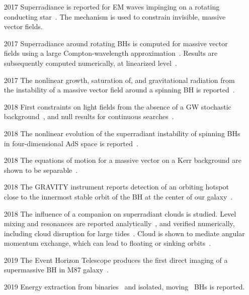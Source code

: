 \documentclass[11pt]{article}
\numberwithin{equation}{section} %
\begin{document}
\begin{itemize}[noitemsep]
\item[2017] Superradiance is reported for EM waves impinging on a rotating conducting star~\cite{Cardoso:2017kgn}. The 
mechanism is used to constrain invisible, massive vector fields.

\item[2017] Superradiance around rotating BHs is computed for massive vector fields using a large Compton-wavelength approximation~\cite{Baryakhtar:2017ngi}. Results are subsequently computed numerically, at linearized level~\cite{Cardoso:2018tly}.

\item[2017] The nonlinear growth, saturation of, and gravitational radiation from the instability of a massive vector 
field around a spinning BH is reported~\cite{East:2018glu}.

\item[2018] First constraints on light fields from the absence of a GW stochastic background~\cite{Brito:2017wnc,Brito:2017zvb,Tsukada:2018mbp,LIGOScientific:2019vic}, and null results for continuous searches~\cite{Brito:2017wnc,Brito:2017zvb,Isi:2018pzk,DAntonio:2018sff,Palomba:2019vxe,Dergachev:2019wqa,Sun:2019mqb,Zhu:2020tht}.

\item[2018] The nonlinear evolution of the superradiant instability of spinning BHs in four-dimensional AdS space is reported~\cite{Chesler:2018txn}.

\item[2018] The equations of motion for a massive vector on a Kerr background are shown to be separable~\cite{Frolov:2018ezx}.

\item[2018] The GRAVITY instrument reports detection of an orbiting hotspot close to the innermost stable orbit
of the BH at the center of our galaxy~\cite{2018A&A...618L..10G}.

\item[2018] The influence of a companion on superradiant clouds is studied. Level mixing and resonances are reported analytically~\cite{Baumann:2018vus,Zhang:2018kib,Baumann:2019ztm}, and verified numerically, including cloud disruption for large tides~\cite{Cardoso:2020hca}. Cloud is shown to mediate angular momentum exchange, which can lead to floating or sinking orbits~\cite{Zhang:2018kib,Baumann:2019ztm}.

\item[2019] The Event Horizon Telescope produces the first direct imaging of a supermassive BH 
in M87 galaxy~\cite{Akiyama:2019cqa}.

\item[2019] Energy extraction from binaries~\cite{Bernard:2019nkv,Wong:2019kru} and isolated, moving~\cite{Cardoso:2019dte} BHs is 
reported.


\end{itemize}
\end{document}

